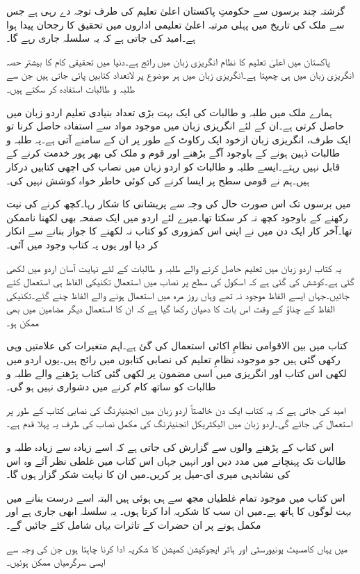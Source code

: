 گزشتہ چند برسوں سے حکومتِ پاکستان اعلیٰ تعلیم کی طرف توجہ دے رہی ہے جس سے ملک کی تاریخ میں پہلی مرتبہ اعلیٰ تعلیمی اداروں میں تحقیق کا رجحان پیدا ہوا ہے۔امید کی جاتی ہے کہ یہ سلسلہ جاری رہے گا۔

پاکستان میں اعلیٰ تعلیم کا نظام انگریزی زبان میں رائج ہے۔دنیا میں تحقیقی کام کا بیشتر حصہ انگریزی زبان میں ہی چھپتا ہے۔انگریزی زبان میں ہر موضوع پر لاتعداد کتابیں پائی جاتی ہیں جن سے طلبہ و طالبات استفادہ کر سکتے ہیں۔

ہمارے ملک میں طلبہ و طالبات کی ایک بہت بڑی تعداد بنیادی تعلیم اردو زبان میں حاصل کرتی ہے۔ان کے لئے انگریزی زبان میں موجود مواد سے استفادہ حاصل کرنا تو ایک طرف، انگریزی زبان ازخود ایک رکاوٹ کے طور پر ان کے سامنے آتی ہے۔یہ طلبہ و طالبات ذہین ہونے کے باوجود آگے بڑھنے اور قوم و ملک کی بھر پور خدمت کرنے کے قابل نہیں رہتے۔ایسے طلبہ و طالبات کو اردو زبان میں نصاب کی اچھی کتابیں درکار ہیں۔ہم نے قومی سطح پر ایسا کرنے کی کوئی خاطر خواہ کوشش نہیں کی۔ 

میں برسوں تک اس صورت حال کی وجہ سے پریشانی کا شکار رہا۔کچھ کرنے کی نیت رکھنے کے باوجود کچھ نہ کر سکتا تھا۔میرے لئے اردو میں ایک صفحہ بھی لکھنا ناممکن تھا۔آخر کار ایک دن میں نے اپنی اس کمزوری کو کتاب نہ لکھنے کا جواز بنانے سے انکار کر دیا اور یوں یہ کتاب وجود میں آئی۔

یہ کتاب اردو زبان میں تعلیم حاصل کرنے والے طلبہ و طالبات کے لئے نہایت آسان اردو میں لکھی گئی ہے۔کوشش کی گئی ہے کہ اسکول کی سطح پر نصاب میں استعمال تکنیکی الفاظ ہی استعمال کئے جائیں۔جہاں ایسے الفاظ موجود نہ تھے وہاں روز مرہ میں استعمال ہونے والے الفاظ چنے گئے۔تکنیکی الفاظ کے چناؤ کے وقت اس بات کا دھیان رکھا گیا ہے کہ ان کا استعمال دیگر مضامین میں بھی ممکن ہو۔

کتاب میں بین الاقوامی نظامِ اکائی استعمال کی گئ ہے۔اہم متغیرات کی علامتیں وہی رکھی گئی ہیں جو موجودہ نظامِ تعلیم کی نصابی کتابوں میں رائج ہیں۔یوں اردو میں لکھی اس کتاب اور انگریزی میں اسی مضمون پر لکھی گئی کتاب پڑھنے والے طلبہ و طالبات کو ساتھ کام کرنے میں دشواری نہیں ہو گی۔ 

امید کی جاتی ہے کہ یہ کتاب ایک دن خالصتاً اردو زبان میں انجنیئرنگ کی نصابی کتاب کے طور پر استعمال کی جائے گی۔اردو زبان میں الیکٹریکل انجنیئرنگ کی مکمل نصاب کی طرف یہ پہلا قدم ہے۔ 

اس کتاب کے پڑھنے والوں سے گزارش کی جاتی ہے کہ اسے زیادہ سے زیادہ طلبہ و طالبات تک پہنچانے میں مدد دیں اور انہیں جہاں اس کتاب میں غلطی نظر آئے وہ اس کی نشاندہی میری ای-میل پر کریں۔میں ان کا نہایت شکر گزار ہوں گا۔

اس کتاب میں موجود تمام غلطیاں مجھ سے ہی ہوئی ہیں البتہ اسے درست بنانے میں بہت لوگوں کا ہاتھ ہے۔میں ان سب کا شکریہ ادا کرتا ہوں۔ یہ سلسلہ ابھی جاری ہے اور مکمل ہونے پر ان حضرات کے تاثرات یہاں شامل کئے جائیں گے۔  

میں یہاں کامسیٹ یونیورسٹی اور ہائر ایجوکیشن کمیشن کا شکریہ ادا کرنا چاہتا ہوں جن کی وجہ سے ایسی سرگرمیاں ممکن ہوئیں۔	
\vspace{5mm}

{}
